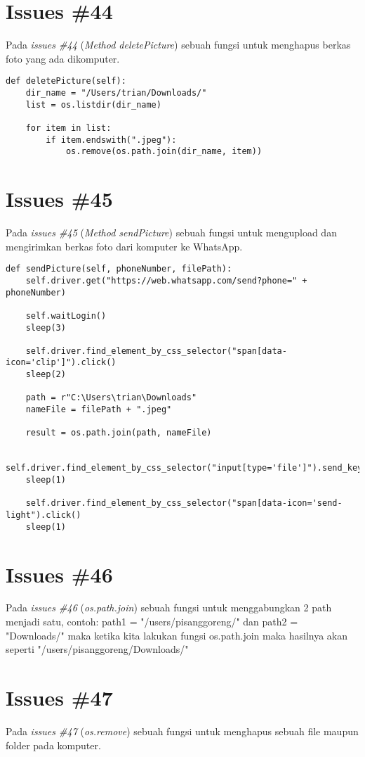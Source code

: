 \section{Issues \#44}
Pada \textit{issues \#44} (\textit{Method deletePicture}) sebuah fungsi untuk menghapus berkas foto yang ada dikomputer.
\begin{verbatim}
def deletePicture(self):
    dir_name = "/Users/trian/Downloads/"
    list = os.listdir(dir_name)

    for item in list:
        if item.endswith(".jpeg"):
            os.remove(os.path.join(dir_name, item))
\end{verbatim}

\section{Issues \#45}
Pada \textit{issues \#45} (\textit{Method sendPicture}) sebuah fungsi untuk mengupload dan mengirimkan berkas foto dari komputer ke WhatsApp.
\begin{verbatim}
def sendPicture(self, phoneNumber, filePath):
    self.driver.get("https://web.whatsapp.com/send?phone=" + phoneNumber)

    self.waitLogin()
    sleep(3)

    self.driver.find_element_by_css_selector("span[data-icon='clip']").click()
    sleep(2)

    path = r"C:\Users\trian\Downloads"
    nameFile = filePath + ".jpeg"

    result = os.path.join(path, nameFile)

    self.driver.find_element_by_css_selector("input[type='file']").send_keys(result)
    sleep(1)

    self.driver.find_element_by_css_selector("span[data-icon='send-light").click()
    sleep(1)
\end{verbatim}

\section{Issues \#46}
Pada \textit{issues \#46} (\textit{os.path.join}) sebuah fungsi untuk menggabungkan 2 path menjadi satu, contoh: path1 = "/users/pisanggoreng/" dan path2 = "Downloads/" maka ketika kita lakukan fungsi os.path.join maka hasilnya akan seperti "/users/pisanggoreng/Downloads/"

\section{Issues \#47}
Pada \textit{issues \#47} (\textit{os.remove}) sebuah fungsi untuk menghapus sebuah file maupun folder pada komputer.

